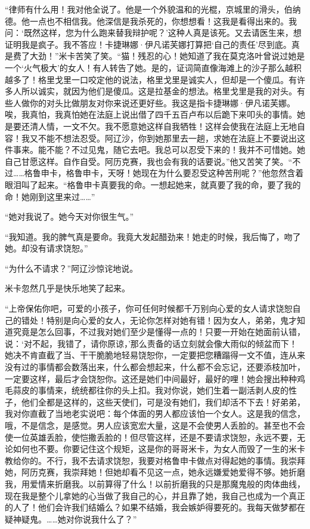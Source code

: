 \par “律师有什么用！我对他全说了。他是一个外貌温和的光棍，京城里的滑头，伯纳德。他一点也不相信我。他深信是我杀死的，你想想看！这我是看得出来的。我问：‘既然这样，您为什么跑来替我辩护呢？’这种人真是该死。又去请医生来，想证明我是疯子。我不答应！卡捷琳娜·伊凡诺芙娜打算把‘自己的责任’尽到底。真是费了大劲！”米卡苦笑了笑。“猫！残忍的心！她知道了我在莫克洛叶曾说过她是一个‘火气极大’的女人！有人转告了她。是的，证词简直像海滩上的沙子那么越积越多了！格里戈里一口咬定他的说法，格里戈里是诚实人，但却是一个傻瓜。有许多人所以诚实，就因为他们是傻瓜。这是拉基金的想法。格里戈里是我的对头。有些人做你的对头比做朋友对你来说还更好些。我这是指卡捷琳娜·伊凡诺芙娜。唉，我真怕，我真怕她在法庭上说出借了四千五百卢布以后跪下来叩头的事情。她是要还清人情，一文不欠。我不愿意她这样自我牺牲！这样会使我在法庭上无地自容！我又不能不想法忍受。阿辽沙，你到她那里去一趟，求她在法庭上不要说出这件事来。能不能？不过见鬼，随它去吧。我总可以忍受下来的！我并不可惜她。她自己甘愿这样。自作自受。阿历克赛，我也会有我的话要说。”他又苦笑了笑。“不过……格鲁申卡，格鲁申卡，天呀！她现在为什么要忍受这种苦刑呢？”他忽然含着眼泪叫了起来。“格鲁申卡真要我的命。一想起她来，就真要了我的命，要了我的命！她刚到这里来过……”
\par “她对我说了。她今天对你很生气。”
\par “我知道。我的脾气真是要命。我竟大发起醋劲来！她走的时候，我后悔了，吻了她。却没有请求饶恕。”
\par “为什么不请求？”阿辽沙惊诧地说。
\par 米卡忽然几乎是快乐地笑了起来。
\par “上帝保佑你吧，可爱的小孩子，你可任何时候都千万别向心爱的女人请求饶恕自己的错处！特别是向心爱的女人，无论你怎样对她有错！因为女人，弟弟，鬼才知道究竟是怎么回事，不过我对她们至少是懂得一点的！只要一开始在她面前认错，说：‘对不起，我错了，请你原谅，’那么责备的话立刻就会像大雨似的倾盆而下！她决不肯直截了当、干干脆脆地轻易饶恕你，一定要把您糟蹋得一文不值，连从来没有过的事情都会数落出来，什么都会想起来，什么都不会忘记，还要添枝加叶，一定要这样，最后才会饶恕你。这还是她们中间最好，最好的哩！她会搜出种种鸡毛蒜皮的事情来，统统都往你的头上扣。我对你说，她们生着一副活剥人皮的性子，他们全都是这样的，这些天使们，可是没有她们，我们却活不下去！好弟弟，我对你直截了当地老实说吧：每个体面的男人都应该怕一个女人。这是我的信念，哦，不是信念，是感觉。男人应该宽宏大量，这是不会使男人丢脸的。甚至也不会使一位英雄丢脸，使恺撒丢脸的！但尽管这样，还是不要请求饶恕，永远不要，无论如何也不要。你要记住这个规矩，这是你的哥哥米卡，为女人而毁了一生的米卡教给你的。不行，我不去请求饶恕，我要对格鲁申卡做点对得起她的事情。我崇拜她，阿历克赛，我崇拜她！但她却看不见这一点，她永远嫌爱她爱得不够。她折磨我，用爱情来折磨我。以前算得了什么！以前折磨我的只是那魔鬼般的肉体曲线，现在我是整个儿拿她的心当做了我自己的心，并且靠了她，我自己也成为一个真正的人了！他们会许我们结婚么？如果不结婚，我会嫉妒得要死的。我每天做梦都在疑神疑鬼。……她对你说我什么了？”
